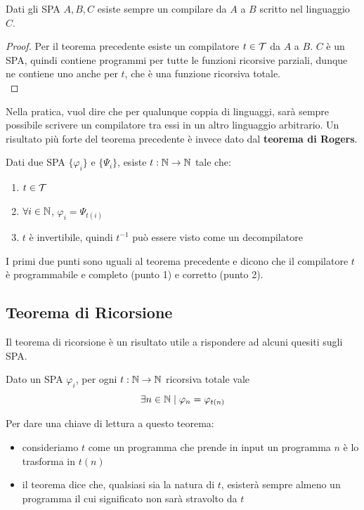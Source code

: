 \begin{coroll}
	Dati gli SPA $A,B,C$ esiste sempre un compilare da $A$ a $B$ scritto nel linguaggio $C$.
\end{coroll}
\begin{proof}
	Per il teorema precedente esiste un compilatore $t \in \mathcal{T}$ da $A$ a $B$. $C$ è un SPA, quindi contiene programmi per tutte le funzioni ricorsive parziali, dunque ne contiene uno anche per $t$, che è una funzione ricorsiva totale.\\
\end{proof}

Nella pratica, vuol dire che per qualunque coppia di linguaggi, sarà sempre possibile scrivere un compilatore tra essi in un altro linguaggio arbitrario. Un risultato più forte del teorema precedente è invece dato dal \textbf{teorema di Rogers}.\\

\begin{theor}
	Dati due SPA $\{\varphi_i\}$ e $\{\Psi_i\}$, esiste $t: \mathbb{N} \rightarrow \mathbb{N}$ tale che: 
	\begin{enumerate}
		\item $t \in \mathcal{T}$
		\item $\forall i \in \mathbb{N}$, $\varphi_i = \Psi_{t(i)}$
		\item $t$ è invertibile, quindi $t^{-1}$ può essere visto come un decompilatore
	\end{enumerate}
\end{theor}

I primi due punti sono uguali al teorema precedente e dicono che il compilatore $t$ è programmabile e completo (punto 1) e corretto (punto 2).\\

\subsection{Teorema di Ricorsione}

Il teorema di ricorsione è un risultato utile a rispondere ad alcuni quesiti sugli SPA. \\

\begin{theor}
	Dato un SPA $\varphi_i$, per ogni $t: \mathbb{N} \rightarrow \mathbb{N}$ ricorsiva totale vale
	$$ \exists n \in \mathbb{N} \mid \varphi_n = \varphi_{t(n)} $$
\end{theor}

Per dare una chiave di lettura a questo teorema: 
\begin{itemize}
	\item consideriamo $t$ come un programma che prende in input un programma $n$ è lo trasforma in $t(n)$
	\item il teorema dice che, qualsiasi sia la natura di $t$, esisterà sempre almeno un programma il cui significato non sarà stravolto da $t$
\end{itemize}


